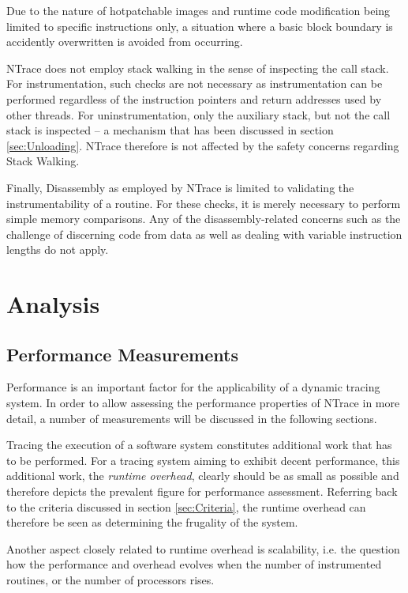 Due to the nature of hotpatchable images and runtime code modification being limited 
to specific instructions only, a situation where a basic block boundary is accidently
overwritten is avoided from occurring.

NTrace does not employ stack walking in the sense of inspecting the call stack. For instrumentation,
such checks are not necessary as instrumentation can be performed regardless of the instruction 
pointers and return addresses used by other threads. For uninstrumentation, 
only the auxiliary stack, but not the call stack is inspected -- a mechanism that has been discussed 
in section \ref{sec:Unloading}. NTrace therefore is not affected by the safety concerns regarding Stack Walking.

Finally, Disassembly as employed by NTrace is limited to validating the instrumentability of a routine. 
For these checks, it is merely necessary to perform simple memory comparisons. Any of the 
disassembly-related concerns such as the challenge of discerning code from data as well as 
dealing with variable instruction lengths do not apply.

%	
%	
%



\part{Analysis}
\chapter{Performance Measurements}
Performance is an important factor for the applicability of a dynamic tracing system. 
In order to allow assessing the performance properties of NTrace in more detail, a number of measurements 
will be discussed in the following sections.

Tracing the execution of a software system constitutes additional work that has to be
performed. For a tracing system aiming to exhibit decent performance, this additional work, 
the \emph{runtime overhead}, clearly should be as small as possible and therefore 
depicts the prevalent figure for performance assessment. Referring back to the criteria 
discussed in section \ref{sec:Criteria}, the runtime overhead can therefore be seen as 
determining the frugality of the system.

Another aspect closely related to runtime overhead is scalability, i.e. the question
how the performance and overhead evolves when the number of instrumented routines, or the
number of processors rises.

